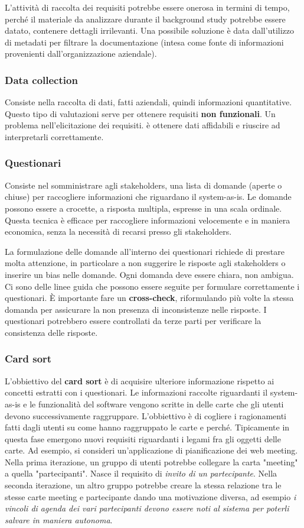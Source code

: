 L'attività di raccolta dei requisiti potrebbe essere onerosa in termini di tempo, perché il materiale da analizzare durante il background study potrebbe essere datato, contenere dettagli irrilevanti. Una possibile soluzione è data dall'utilizzo di metadati per filtrare la documentazione (intesa come fonte di informazioni provenienti dall'organizzazione aziendale).

\subsubsection{Data collection}
Consiste nella raccolta di dati, fatti aziendali, quindi informazioni quantitative. Questo tipo di valutazioni serve per ottenere requisiti \textbf{non funzionali}. Un problema nell'elicitazione dei requisiti. è ottenere dati affidabili e riuscire ad interpretarli correttamente.
\subsubsection{Questionari} Consiste nel somministrare agli stakeholders, una lista di domande (aperte o chiuse) per raccogliere informazioni che riguardano il system-as-is. Le domande possono essere a crocette, a risposta multipla, espresse in una scala ordinale. Questa tecnica è efficace per raccogliere informazioni velocemente e in maniera economica, senza la necessità di recarsi presso gli stakeholders.

La formulazione delle domande all'interno dei questionari richiede di prestare molta attenzione,   in particolare a non suggerire le risposte agli stakeholders o inserire un bias nelle domande. Ogni domanda deve essere chiara, non ambigua. Ci sono delle linee guida che possono essere seguite per formulare correttamente i questionari. È importante fare un \textbf{cross-check}, riformulando più volte la stessa domanda per assicurare la non presenza di inconsistenze nelle risposte.
I questionari potrebbero essere controllati da terze parti per verificare la consistenza delle risposte.
\subsubsection{Card sort} L'obbiettivo del \textbf{card sort} è di acquisire ulteriore informazione rispetto ai concetti estratti con i questionari. Le informazioni raccolte riguardanti il system-as-is e le funzionalità del software vengono scritte in delle carte che gli utenti devono successivamente raggruppare. L'obbiettivo è di cogliere i ragionamenti fatti dagli utenti su come hanno raggruppato le carte e perché. Tipicamente in questa fase emergono nuovi requisiti riguardanti i legami fra gli oggetti delle carte. Ad esempio, si consideri un'applicazione di pianificazione dei web meeting. Nella prima iterazione, un gruppo di utenti potrebbe collegare la carta "meeting" a quella "partecipanti". Nasce il requisito di \textit{invito di un partecipante}. Nella seconda iterazione, un altro gruppo potrebbe creare la stessa relazione tra le stesse carte meeting e partecipante dando una motivazione diversa, ad esempio \textit{i vincoli di agenda dei vari partecipanti devono essere noti al sistema per poterli salvare in maniera autonoma}.
